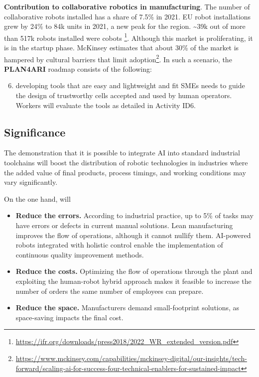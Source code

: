 
\textbf{Contribution to collaborative robotics in manufacturing}. The
number of collaborative robots installed has a share of 7.5\% in 2021.
EU robot installations grew by 24\% to 84k units in 2021, a new peak for
the region. \textasciitilde39k out of more than 517k robots installed
were cobots \footnote{\url{https://ifr.org/downloads/press2018/2022_WR_extended_version.pdf}}.
Although this market is proliferating, it is in the startup phase.
McKinsey estimates that about 30\% of the market is hampered by cultural
barriers that limit adoption\footnote{\url{https://www.mckinsey.com/capabilities/mckinsey-digital/our-insights/tech-forward/scaling-ai-for-success-four-technical-enablers-for-sustained-impact}}.
In such a scenario, the \textbf{PLAN4ARI} roadmap consists of the
following:

\begin{enumerate}[action]
\setcounter{enumi}{5}
\item
  developing tools that are easy and lightweight and fit
  SMEs\textquotesingle{} needs to guide the design of trustworthy cells
  accepted and used by human operators. Workers will evaluate the tools
  as detailed in Activity ID6.
\end{enumerate}


\subsection{Significance}\label{significance}

The  demonstration that it is
possible to integrate AI into standard industrial toolchains will boost
the distribution of robotic technologies in industries where the added
value of final products, process timings, and working conditions may
vary significantly.

On the one hand,  will

\begin{itemize}[compact]
\item
  \textbf{Reduce the errors.} According to industrial practice, up to
  5\% of tasks may have errors or defects in current manual solutions.
  Lean manufacturing improves the flow of operations, although it cannot
  nullify them. AI-powered robots integrated with holistic control
  enable the implementation of continuous quality improvement methods.
\item
  \textbf{Reduce the costs.} Optimizing the flow of operations through
  the plant and exploiting the human-robot hybrid approach makes it
  feasible to increase the number of orders the same number of employees
  can prepare.
\item
  \textbf{Reduce the space.} Manufacturers demand small-footprint
  solutions, as space-saving impacts the final cost.
\end{itemize}

